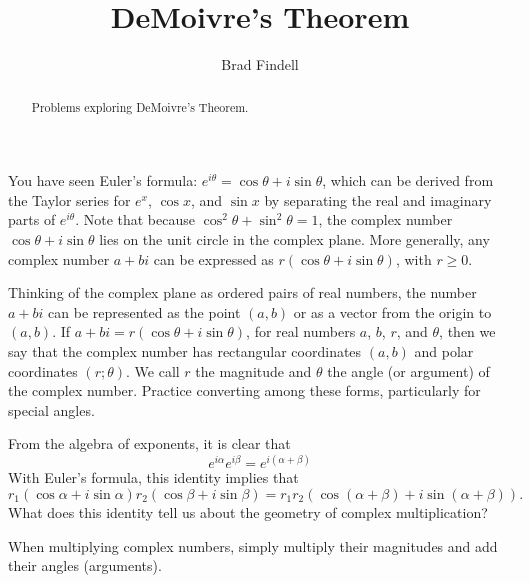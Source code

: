 \documentclass[space,nooutcomes]{ximera}
\title{DeMoivre's Theorem}
\author{Brad Findell}
\begin{document}
\begin{abstract}
Problems exploring DeMoivre's Theorem.   
\end{abstract}
\maketitle




You have seen Euler's formula: $e^{i\theta}=\cos\theta +i\sin\theta$, which can be derived from the Taylor series for $e^{x}$, $\cos x$, and $\sin x$ by separating the real and imaginary parts of $e^{i\theta}$.  Note that because 
$\cos^2\theta+\sin^2\theta=1$, the complex number $\cos\theta +i\sin\theta$ lies on the 
unit circle in the complex plane.  More generally, any complex number $a+bi$ can be expressed as $r(\cos\theta +i\sin\theta)$, with $r\ge 0$.  

Thinking of the complex plane as ordered pairs of real numbers, the number $a+bi$ can be represented as the point $(a,b)$ or as a vector from the origin to
$(a,b)$.  If $a+bi = r(\cos\theta +i\sin\theta)$, for real numbers $a$, $b$, $r$, and $\theta$, then we say that the complex number has rectangular coordinates $(a,b)$ and polar coordinates $(r;\theta)$. We call $r$ the magnitude and $\theta$ the angle (or argument) of the complex number. Practice converting among these forms, particularly for special angles.


\begin{problem}
From the algebra of exponents, it is clear that 
\[
e^{i\alpha}e^{i\beta}=e^{i(\alpha + \beta)} 
\]
With Euler's formula, this identity implies that 
\[
r_1(\cos\alpha + i\sin\alpha)r_2(\cos\beta + i\sin\beta)
=r_1 r_2\left(\cos(\alpha+\beta) + i\sin(\alpha+\beta)\right). 
\]
What does this identity tell us about the geometry of complex multiplication?  
\begin{freeResponse}
\begin{hint}
When multiplying complex numbers, simply multiply their magnitudes and add their angles (arguments).  
\end{hint}
\end{freeResponse}
\end{problem}
\end{document}
